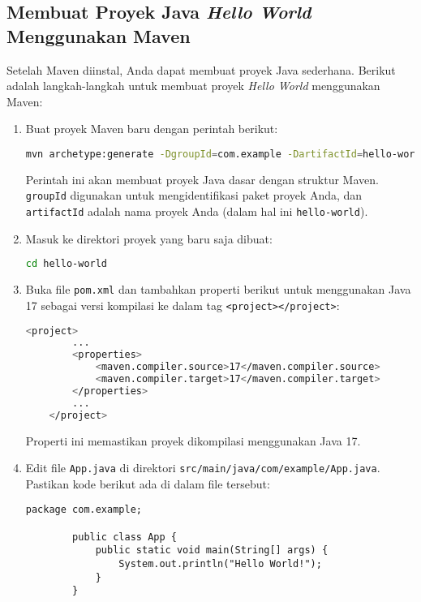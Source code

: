 \subsection{Membuat Proyek Java \textit{Hello World} Menggunakan Maven}

Setelah Maven diinstal, Anda dapat membuat proyek Java sederhana. Berikut adalah langkah-langkah untuk membuat proyek \textit{Hello World} menggunakan Maven:

\begin{enumerate}
	\item Buat proyek Maven baru dengan perintah berikut:
	\begin{lstlisting}[language=bash]
		mvn archetype:generate -DgroupId=com.example -DartifactId=hello-world -DarchetypeArtifactId=maven-archetype-quickstart -DinteractiveMode=false
	\end{lstlisting}
	Perintah ini akan membuat proyek Java dasar dengan struktur Maven. 
	\texttt{groupId} digunakan untuk mengidentifikasi paket proyek Anda, dan \texttt{artifactId} adalah nama proyek Anda (dalam hal ini \texttt{hello-world}).
	
	\item Masuk ke direktori proyek yang baru saja dibuat:
	\begin{lstlisting}[language=bash]
		cd hello-world
	\end{lstlisting}
	
	\item Buka file \texttt{pom.xml} dan tambahkan properti berikut untuk menggunakan Java 17 sebagai versi kompilasi ke dalam tag \texttt{<project></project>}:
	\begin{lstlisting}[language=bash]
	<project>
		...
		<properties>
			<maven.compiler.source>17</maven.compiler.source>
			<maven.compiler.target>17</maven.compiler.target>
		</properties>
		...
	</project>
	\end{lstlisting}
	Properti ini memastikan proyek dikompilasi menggunakan Java 17.
	
	\item Edit file \texttt{App.java} di direktori \texttt{src/main/java/com/example/App.java}. Pastikan kode berikut ada di dalam file tersebut:
	\begin{lstlisting}[style=java]
		package com.example;
		
		public class App {
			public static void main(String[] args) {
				System.out.println("Hello World!");
			}
		}
	\end{lstlisting}
	

\end{enumerate}
